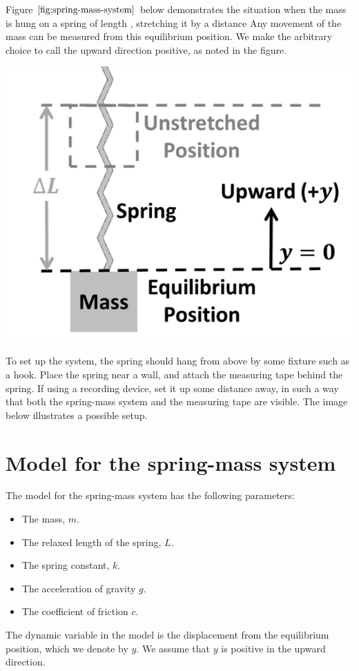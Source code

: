 \documentclass{ximera}
\begin{document}
Figure $\ref{fig:spring-mass-system}$ below demonstrates the situation when the mass is hung on a spring of length , stretching it by a distance   Any movement of the mass can be measured from this equilibrium position.  We make the arbitrary choice to call the upward direction positive, as noted in the figure.  

\begin{center}
    \includegraphics[scale=0.5]{spring-mass.png}
\end{center}    

To set up the system, the spring should hang from above by some fixture such as a hook. Place the spring near a wall, and attach the measuring tape behind the spring. If using a recording device, set it up some distance away, in such a way that both the spring-mass system and the measuring tape are visible. The image below illustrates a possible setup.

\section{Model for the spring-mass system}

The model for the spring-mass system has the following parameters:
\begin{itemize}
    \item The mass, $m$.
    \item The relaxed length of the spring, $L$.
    \item The spring constant, $k$.
    \item The acceleration of gravity $g$.
    \item The coefficient of friction $c$.
\end{itemize}
The dynamic variable in the model is the displacement from the equilibrium position, which we denote by $y$. We assume that $y$ is positive in the upward direction.
\end{document}
